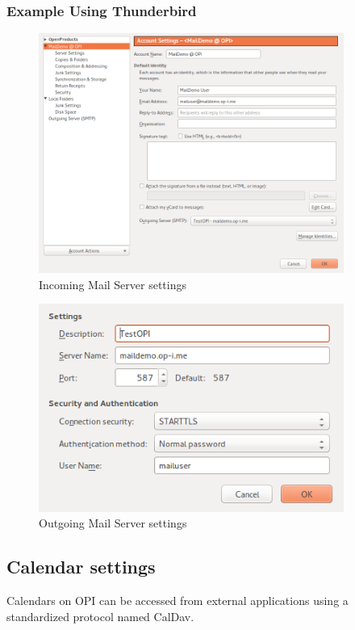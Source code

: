 \documentclass[12pt,a4paper,titlepage]{article}
\begin{document}
\subsubsection{Example Using Thunderbird}
\begin{figure}[h!]
\centering
\includegraphics[width=10cm]{./img/External-clients-thunderbird1.png}
\caption{Incoming Mail Server settings}
\end{figure}
\begin{figure}[h!]
\centering
\includegraphics[width=10cm]{./img/External-clients-thunderbird2.png}
\caption{Outgoing Mail Server settings}
\end{figure}

\newpage
\subsection{Calendar settings}
Calendars on OPI can be accessed from external applications using a standardized protocol named CalDav.
\end{document}
